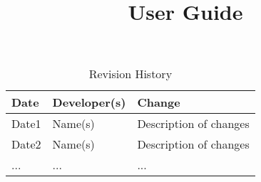 \documentclass{article}
\title{User Guide\\\progname}
\author{\authname}
\date{}
\begin{document}
\begin{table}[hp]
  \caption{Revision History} \label{TblRevisionHistory}
  \begin{tabularx}{\textwidth}{llX}
    \toprule
    \textbf{Date} & \textbf{Developer(s)} & \textbf{Change}        \\
    \midrule
    Date1         & Name(s)               & Description of changes \\
    Date2         & Name(s)               & Description of changes \\
    ...           & ...                   & ...                    \\
    \bottomrule
  \end{tabularx}
\end{table}

\newpage

\maketitle
\end{document}
